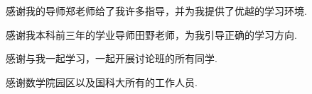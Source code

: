 感谢我的导师郑老师给了我许多指导，并为我提供了优越的学习环境.

感谢我本科前三年的学业导师田野老师，为我引导正确的学习方向.

感谢与我一起学习，一起开展讨论班的所有同学.

感谢数学院园区以及国科大所有的工作人员.
